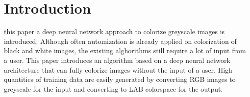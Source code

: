 \section{Introduction}\label{sec:into}
 this paper a deep neural network approach to colorize greyscale images is introduced. Although often automization is already applied on colorization of black and white images, the existing alghorithms still require a lot of input from a user. This paper introduces an algorithm based on a deep neural network architecture that can fully colorize images without the input of a user. High quantities of training data are easily generated by converting RGB images to greyscale for the input and converting to LAB colorspace for the output. 